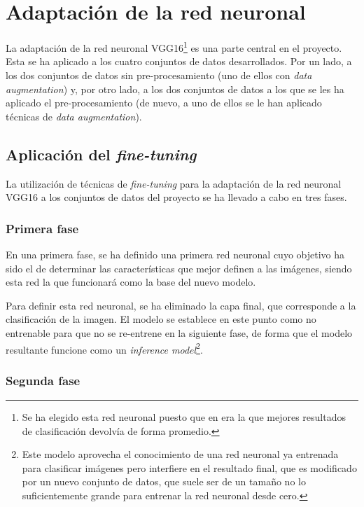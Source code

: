 \section{Adaptación de la red neuronal} \label{adaptacion-red}

La adaptación de la red neuronal VGG16\footnote{Se ha elegido esta red neuronal puesto que en \cite{tfg_iris_2020} era la que mejores resultados de clasificación devolvía de forma promedio.} es una parte central en el proyecto.
Esta se ha aplicado a los cuatro conjuntos de datos desarrollados. Por un lado, a los dos conjuntos de datos sin pre-procesamiento (uno de ellos con \textit{data augmentation}) y, por otro lado, a los dos conjuntos de datos a los que se les ha aplicado el pre-procesamiento (de nuevo, a uno de ellos se le han aplicado técnicas de \textit{data augmentation}). 
\subsection{Aplicación del \textit{fine-tuning}}

La utilización de técnicas de \textit{fine-tuning} para la adaptación de la red neuronal VGG16 a los conjuntos de datos del proyecto se ha llevado a cabo en tres fases. 

\subsubsection{Primera fase}
En una primera fase, se ha definido una primera red neuronal cuyo objetivo ha sido el de determinar las características que mejor definen a las imágenes, siendo esta red la que funcionará como la base del nuevo modelo. 

Para definir esta red neuronal, se ha eliminado la capa final, que corresponde a la clasificación de la imagen. El modelo se establece en este punto como no entrenable para que no se re-entrene en la siguiente fase, de forma que el modelo resultante funcione como un \textit{inference model}\footnote{Este modelo aprovecha el conocimiento de una red neuronal ya entrenada para clasificar imágenes pero interfiere en el resultado final, que es modificado por un nuevo conjunto de datos, que suele ser de un tamaño no lo suficientemente grande para entrenar la red neuronal desde cero.}. 

\subsubsection{Segunda fase}

